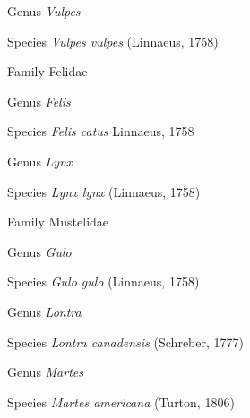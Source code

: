 \documentclass[9pt, article]{memoir}
\begin{document}
\begin{multicols}{2}
\vspace{6pt}\noindent\hspace{30pt}Genus \textit{Vulpes}


\vspace{6pt}\noindent\hspace{36pt}Species \textit{Vulpes vulpes} (Linnaeus, 1758)


\vspace{6pt}\noindent\hspace{24pt}Family Felidae


\vspace{6pt}\noindent\hspace{30pt}Genus \textit{Felis}


\vspace{6pt}\noindent\hspace{36pt}Species \textit{Felis catus} Linnaeus, 1758


\vspace{6pt}\noindent\hspace{30pt}Genus \textit{Lynx}


\vspace{6pt}\noindent\hspace{36pt}Species \textit{Lynx lynx} (Linnaeus, 1758)


\vspace{6pt}\noindent\hspace{24pt}Family Mustelidae


\vspace{6pt}\noindent\hspace{30pt}Genus \textit{Gulo}


\vspace{6pt}\noindent\hspace{36pt}Species \textit{Gulo gulo} (Linnaeus, 1758)


\vspace{6pt}\noindent\hspace{30pt}Genus \textit{Lontra}


\vspace{6pt}\noindent\hspace{36pt}Species \textit{Lontra canadensis} (Schreber, 1777)


\vspace{6pt}\noindent\hspace{30pt}Genus \textit{Martes}


\vspace{6pt}\noindent\hspace{36pt}Species \textit{Martes americana} (Turton, 1806)



\end{multicols}
\end{document}
